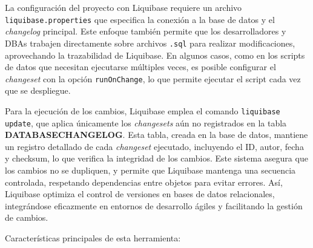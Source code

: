 \documentclass{IEEEtran}
\begin{document}
La configuración del proyecto con Liquibase requiere un archivo \texttt{liquibase.properties} que especifica la conexión a la base de datos y el \textit{changelog} principal. Este enfoque también permite que los desarrolladores y DBAs trabajen directamente sobre archivos \texttt{.sql} para realizar modificaciones, aprovechando la trazabilidad de Liquibase. En algunos casos, como en los scripts de datos que necesitan ejecutarse múltiples veces, es posible configurar el \textit{changeset} con la opción \texttt{runOnChange}, lo que permite ejecutar el script cada vez que se despliegue.

Para la ejecución de los cambios, Liquibase emplea el comando \texttt{liquibase update}, que aplica únicamente los \textit{changesets} aún no registrados en la tabla \textbf{DATABASECHANGELOG}. Esta tabla, creada en la base de datos, mantiene un registro detallado de cada \textit{changeset} ejecutado, incluyendo el ID, autor, fecha y checksum, lo que verifica la integridad de los cambios. Este sistema asegura que los cambios no se dupliquen, y permite que Liquibase mantenga una secuencia controlada, respetando dependencias entre objetos para evitar errores. Así, Liquibase optimiza el control de versiones en bases de datos relacionales, integrándose eficazmente en entornos de desarrollo ágiles y facilitando la gestión de cambios.


Características principales de esta herramienta:
\end{document}
